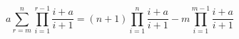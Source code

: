 \documentclass[a4paper,landscape]{memoir}
\begin{document}
\thispagestyle{empty}

\begin{vplace}[0.69]
\begin{Huge}
\[a\sum\limits_{r=m}^n\prod\limits_{i=1}^{r-1}\frac{i+a}{i+1}
=(n+1)\prod\limits_{i=1}^n\frac{i+a}{i+1}-m\prod\limits_{i=1}^{m-1}\frac{i+a}{i+1}\]
\end{Huge}
\end{vplace}
\end{document}
